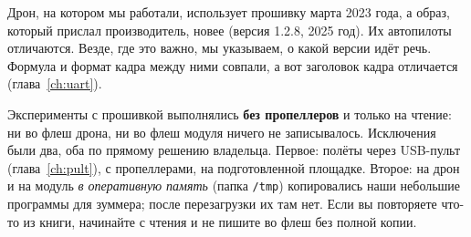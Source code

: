 \begin{vnimanie}
Дрон, на котором мы работали, использует прошивку марта 2023 года, а образ, который прислал производитель, новее (версия 1.2.8, 2025 год). Их автопилоты отличаются. Везде, где это важно, мы указываем, о какой версии идёт речь. Формула и формат кадра между ними совпали, а вот заголовок кадра отличается (глава~\ref{ch:uart}).
\end{vnimanie}

\begin{opasno}
Эксперименты с прошивкой выполнялись \textbf{без пропеллеров} и только на чтение: ни во флеш дрона, ни во флеш модуля ничего не записывалось. Исключения были два, оба по прямому решению владельца. Первое: полёты через USB-пульт (глава~\ref{ch:pult}), с пропеллерами, на подготовленной площадке. Второе: на дрон и на модуль \emph{в оперативную память} (папка \texttt{/tmp}) копировались наши небольшие программы для зуммера; после перезагрузки их там нет. Если вы повторяете что-то из книги, начинайте с чтения и не пишите во флеш без полной копии.
\end{opasno}
